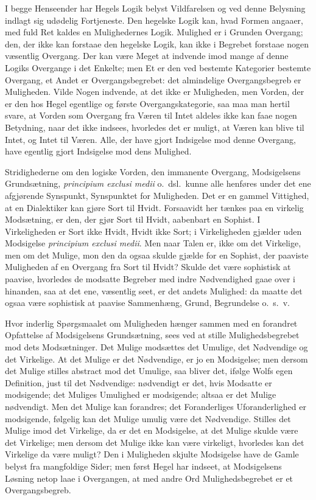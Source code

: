 \documentclass[12pt]{book}
\newcommand{\opage}[1]{\marginnote{\footnotesize\textit{[#1]}}}
\begin{document}
I begge Henseender har Hegels Logik belyst Vildfarelsen og ved denne Belysning indlagt sig udødelig Fortjeneste. Den hegelske Logik kan, hvad Formen angaaer, med fuld Ret kaldes en Mulighedernes Logik. Mulighed er i Grunden Overgang; den, der ikke kan forstaae den hegelske Logik, kan ikke i Begrebet forstaae nogen væsentlig Overgang. Der kan være Meget at indvende imod mange af denne Logiks Overgange i det Enkelte; men Et er den ved bestemte Kategorier bestemte Overgang, et Andet er Overgangsbegrebet: det almindelige Overgangsbegreb er Muligheden. Vilde Nogen indvende, at det ikke er Muligheden, men Vorden, der er den hos Hegel egentlige og første Overgangskategorie, saa maa man hertil svare, at Vorden som Overgang fra Væren til Intet aldeles ikke kan faae nogen Betydning, naar det ikke indsees, hvorledes det er muligt, at Væren kan blive til Intet, og Intet til Væren. Alle, der have gjort Indsigelse mod denne Overgang, have egentlig gjort Indsigelse mod dens Mulighed.

Stridighederne om den logiske Vorden, den immanente Overgang, Modsigelsens Grundsætning, \textit{principium exclusi medii} o.\ dsl.\ kunne alle henføres under det ene afgjørende Synspunkt, Synspunktet for Muligheden. Det er en gammel Vittighed, at en Dialektiker kan gjøre Sort til Hvidt. Forsaavidt her tænkes paa en virkelig Modsætning, er den, der
\opage{236}gjør Sort til Hvidt, aabenbart en Sophist. I Virkeligheden er Sort ikke Hvidt, Hvidt ikke Sort; i Virkeligheden gjælder uden Modsigelse \textit{principium exclusi medii}. Men naar Talen er, ikke om det Virkelige, men om det Mulige, mon den da ogsaa skulde gjælde for en Sophist, der paaviste Muligheden af en Overgang fra Sort til Hvidt? Skulde det være sophistisk at paavise, hvorledes de modsatte Begreber med indre Nødvendighed gaae over i hinanden, saa at det ene, væsentlig seet, er det andets Mulighed: da maatte det ogsaa være sophistisk at paavise Sammenhæng, Grund, Begrundelse o.\ s.\ v.

Hvor inderlig Spørgsmaalet om Muligheden hænger sammen med en forandret Opfattelse af Modsigelsens Grundsætning, sees ved at stille Mulighedsbegrebet mod dets Modsætninger. Det Mulige modsættes det Umulige, det Nødvendige og det Virkelige. At det Mulige er det Nødvendige, er jo en Modsigelse; men dersom det Mulige stilles abstract mod det Umulige, saa bliver det, ifølge Wolfs egen Definition, just til det Nødvendige: nødvendigt er det, hvis Modsatte er modsigende; det Muliges Umulighed er modsigende; altsaa er det Mulige nødvendigt. Men det Mulige kan forandres; det Foranderliges Uforanderlighed er modsigende, følgelig kan det Mulige umulig være det Nødvendige. Stilles det Mulige imod det Virkelige, da er det en Modsigelse, at det Mulige skulde være det Virkelige; men dersom det Mulige ikke kan være virkeligt, hvorledes kan det Virkelige da være muligt? Den i Muligheden skjulte Modsigelse have de Gamle belyst fra mangfoldige Sider; men først Hegel har indseet, at Modsigelsens Løsning netop laae i Overgangen, at med andre Ord Mulighedsbegrebet er et Overgangsbegreb.
\end{document}
